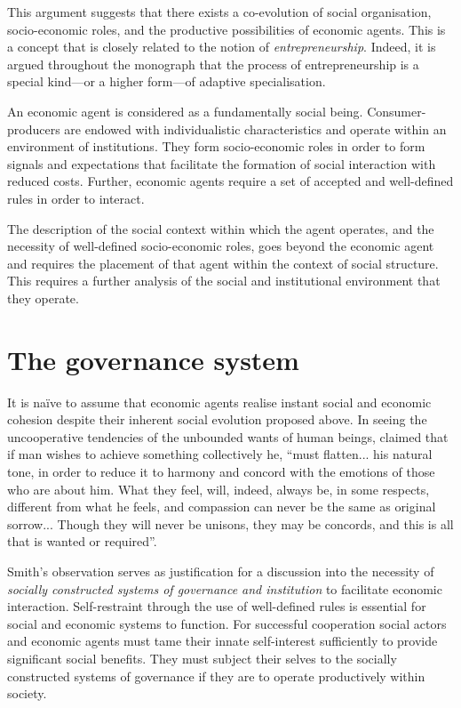 This argument suggests that there exists a co-evolution of social organisation, socio-economic roles, and the productive possibilities of economic agents. This is a concept that is closely related to the notion of \emph{entrepreneurship}. Indeed, it is argued throughout the monograph that the process of entrepreneurship is a special kind---or a higher form---of adaptive specialisation.

\medskip \noindent An economic agent is considered as a fundamentally social being. Consumer-producers are endowed with individualistic characteristics and operate within an environment of institutions. They form socio-economic roles in order to form signals and expectations that facilitate the formation of social interaction with reduced costs. Further, economic agents require a set of accepted and well-defined rules in order to interact.

The description of the social context within which the agent operates, and the necessity of well-defined socio-economic roles, goes beyond the economic agent and requires the placement of that agent within the context of social structure. This requires a further analysis of the social and institutional environment that they operate.

\section{The governance system}

It is na\"{i}ve to assume that economic agents realise instant social and economic cohesion despite their inherent social evolution proposed above. In seeing the uncooperative tendencies of the unbounded wants of human beings, \citet[p.~17]{Smith1759} claimed that if man wishes to achieve something collectively he, ``must flatten... his natural tone, in order to reduce it to harmony and concord with the emotions of those who are about him. What they feel, will, indeed, always be, in some respects, different from what he feels, and compassion can never be the same as original sorrow... Though they will never be unisons, they may be concords, and this is all that is wanted or required''.

Smith's observation serves as justification for a discussion into the necessity of \emph{socially constructed systems of governance and institution} to facilitate economic interaction. Self-restraint through the use of well-defined rules is essential for social and economic systems to function. For successful cooperation social actors and economic agents must tame their innate self-interest sufficiently to provide significant social benefits. They must subject their selves to the socially constructed systems of governance if they are to operate productively within society.

